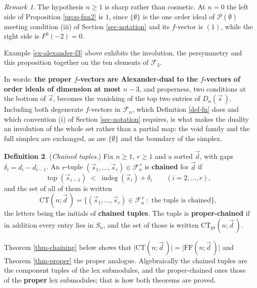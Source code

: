 \documentclass[11pt, a4paper, abstract=yes]{scrartcl}
\theoremstyle{definition}
\newtheorem{definition}{Definition}
\theoremstyle{remark}
\newtheorem{remark}[definition]{Remark}
\theoremstyle{plain}
\newcommand{\indeg}{\operatorname{indeg}}
\newcommand{\tp}{\operatorname{top}}
\begin{document}
\begin{remark}
The hypothesis \(n\ge1\) is sharp rather than cosmetic. At \(n=0\) the left side of
Proposition \ref{prop-fnn2} is \(1\), since \(\lbrace\emptyset\rbrace\) is the one order ideal of
\(\mathcal P(\emptyset)\) meeting condition (iii) of Section \ref{sec-notation} and its \(f\)-vector is
\((1)\), while the right side is \(F^0(-2)=0\).
\label{rem-fnn2-sharp}
\end{remark}

Example \ref{ex-alexander-f3} above exhibits the involution, the persymmetry and this proposition
together on the ten elements of \(\mathcal F_3\).

In words: \textbf{the proper \(f\)-vectors are Alexander-dual to the \(f\)-vectors of order ideals of
dimension at most \(n-3\)}, and properness, two conditions at the bottom of \(\vec s\), becomes
the vanishing of the top two entries of \(D_n(\vec s\,)\). Including both degenerate \(f\)-vectors in
\(\mathcal F_n\), which Definition \ref{def-fn} does and which convention (i) of Section
\ref{sec-notation} requires, is what makes the duality an involution of the whole set rather than a
partial map: the void family and the full simplex are exchanged, as are \(\lbrace\emptyset\rbrace\)
and the boundary of the simplex.

\begin{definition}
(\emph{Chained tuples.}) Fix \(n\ge1\), \(r\ge1\) and a sorted \(\vec d\), with gaps
\(\delta_i=d_i-d_{i-1}\). An \(r\)-tuple \((\vec s_1,\dots,\vec s_r)\in\mathcal F_n^{\,r}\) is
\textbf{chained} for \(\vec d\) if
\begin{equation}\label{eq:chaining-condition}
  \tp(\vec s_{i-1})\;<\;\indeg(\vec s_i)+\delta_i \qquad (i=2,\dots,r) ,
\end{equation}
and the set of all of them is written
\begin{equation}\label{eq:chained-set}
  \mathrm{CT}(n;\vec d\,)=\bigl\lbrace(\vec s_1,\dots,\vec s_r)\in\mathcal F_n^{\,r}\;:\;
    \text{the tuple is chained}\bigr\rbrace ,
\end{equation}
the letters being the initials of \textbf{chained tuples}. The tuple is \textbf{proper-chained} if in addition
every entry lies in \(S_n\), and the set of those is written \(\mathrm{CT}_{\mathrm{pr}}(n;\vec d\,)\).

Theorem \ref{thm-chaining} below shows that \(\lvert\mathrm{CT}(n;\vec d\,)\rvert=\lvert\mathrm{FF}(n;\vec
d\,)\rvert\) and Theorem \ref{thm-proper} the proper analogue. Algebraically the chained tuples are the
component tuples of the lex submodules, and the proper-chained ones those of the \textbf{proper} lex
submodules; that is how both theorems are proved.
\label{def-chained}
\end{definition}
\end{document}
